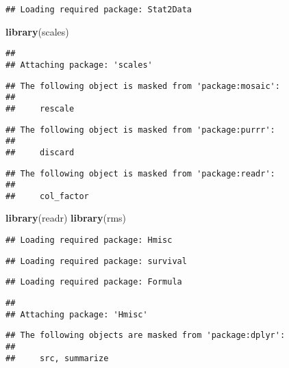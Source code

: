 \documentclass[]{tufte-handout}
\newenvironment{Shaded}{\begin{snugshade}}{\end{snugshade}}
\newcommand{\KeywordTok}[1]{\textcolor[rgb]{0.13,0.29,0.53}{\textbf{#1}}}
\newcommand{\NormalTok}[1]{#1}
\begin{document}
\begin{verbatim}
## Loading required package: Stat2Data
\end{verbatim}

\begin{Shaded}
\begin{Highlighting}[]
\KeywordTok{library}\NormalTok{(scales)}
\end{Highlighting}
\end{Shaded}

\begin{verbatim}
## 
## Attaching package: 'scales'
\end{verbatim}

\begin{verbatim}
## The following object is masked from 'package:mosaic':
## 
##     rescale
\end{verbatim}

\begin{verbatim}
## The following object is masked from 'package:purrr':
## 
##     discard
\end{verbatim}

\begin{verbatim}
## The following object is masked from 'package:readr':
## 
##     col_factor
\end{verbatim}

\begin{Shaded}
\begin{Highlighting}[]
\KeywordTok{library}\NormalTok{(readr)}
\KeywordTok{library}\NormalTok{(rms)}
\end{Highlighting}
\end{Shaded}

\begin{verbatim}
## Loading required package: Hmisc
\end{verbatim}

\begin{verbatim}
## Loading required package: survival
\end{verbatim}

\begin{verbatim}
## Loading required package: Formula
\end{verbatim}

\begin{verbatim}
## 
## Attaching package: 'Hmisc'
\end{verbatim}

\begin{verbatim}
## The following objects are masked from 'package:dplyr':
## 
##     src, summarize
\end{verbatim}
\end{document}
